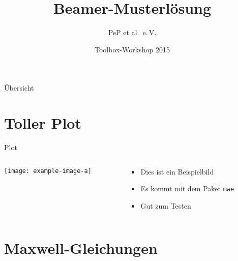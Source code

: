 \documentclass{beamer}
\author{PeP et al.\ e.\,V.}
\institute{TU Dortmund}
\date{Toolbox-Workshop 2015}
\title{Beamer-Musterlösung}
\begin{document}
\begin{frame}
  \maketitle
\end{frame}

\begin{frame}{Übersicht}
  \tableofcontents
\end{frame}

\section{Toller Plot}

\begin{frame}{Plot}
  \begin{columns}[c, onlytextwidth]
    \begin{column}{0.42\textwidth}
      \texttt{[image: example-image-a]}
    \end{column}
    \begin{column}{0.52\textwidth}
      \begin{itemize}
        \item Dies ist ein Beispielbild
        \item Es kommt mit dem Paket \texttt{mwe}
        \item Gut zum Testen
      \end{itemize}
    \end{column}
  \end{columns} 
\end{frame}

\section{Maxwell-Gleichungen}
\end{document}
